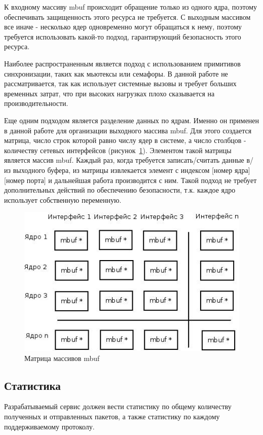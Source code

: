 К входному массиву mbuf происходит обращение только из одного ядра, поэтому обеспечивать защищенность этого ресурса не требуется. С выходным массивом все иначе - несколько ядер одновременно могут обращаться к нему, поэтому требуется использовать какой-то подход, гарантирующий безопасность этого ресурса.

Наиболее распространенным является подход с использованием примитивов синхронизации, таких как мьютексы или семафоры. В данной работе не рассматривается, так как использует системные вызовы и требует больших временных затрат, что при высоких нагрузках плохо сказывается на производительности.

Еще одним подходом является разделение данных по ядрам. Именно он применен в данной работе для организации выходного массива mbuf. Для этого создается матрица, число строк которой равно числу ядер в системе, а число столбцов - количеству сетевых интерфейсов (рисунок~\ref{pic:mbuf_matrix}). Элементом такой матрицы является массив mbuf. Каждый раз, когда требуется записать/считать данные в/из выходного буфера, из матрицы извлекается элемент с индексом [номер ядра][номер порта] и дальнейшая работа производится с ним. Такой подход не требует дополнительных действий по обеспечению безопасности, т.к. каждое ядро использует собственную переменную.
\begin{figure}
\centering
\includegraphics[scale=0.6]{pictures/mbuf_matrix}
\caption{Матрица массивов mbuf}
\label{pic:mbuf_matrix}
\end{figure}

\subsection{Статистика}
Разрабатываемый сервис должен вести статистику по общему количеству полученных и отправленных пакетов, а также статистику по каждому поддерживаемому протоколу.

